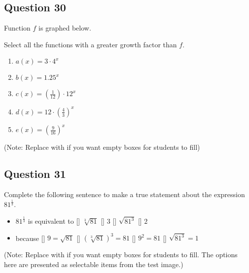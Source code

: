 \documentclass[12pt]{article}
\begin{document}
\subsection*{Question 30}
Function \(f\) is graphed below.
\begin{center}
\end{center}
Select all the functions with a greater growth factor than \(f\).
\begin{enumerate}[label=\Alph*.]
    \item[\XBox] \( a(x) = 3 \cdot 4^x \)
    \item[\XBox] \( b(x) = 1.25^x \)
    \item[\XBox] \( c(x) = \left(\frac{1}{12}\right) \cdot 12^x \)
    \item[\XBox] \( d(x) = 12 \cdot \left(\frac{4}{3}\right)^x \)
    \item[\XBox] \( e(x) = \left(\frac{9}{16}\right)^x \)
\end{enumerate}
(Note: Replace \XBox with \Square if you want empty boxes for students to fill)

\subsection*{Question 31}
Complete the following sentence to make a true statement about the expression \( 81^{\frac{1}{3}} \).
\begin{itemize}
    \item \( 81^{\frac{1}{3}} \) is equivalent to [\XBox] \( \sqrt[3]{81} \) [\XBox] \( 3 \) [\XBox] \( \sqrt{81^3} \) [\XBox] \( 2 \)
    \item because [\XBox] \( 9 = \sqrt{81} \) [\XBox] \( (\sqrt[3]{81})^3 = 81 \) [\XBox] \( 9^2 = 81 \) [\XBox] \( \sqrt{81^3} = 1 \)
\end{itemize}
(Note: Replace \XBox with \Square if you want empty boxes for students to fill. The options here are presented as selectable items from the test image.)
\end{document}
